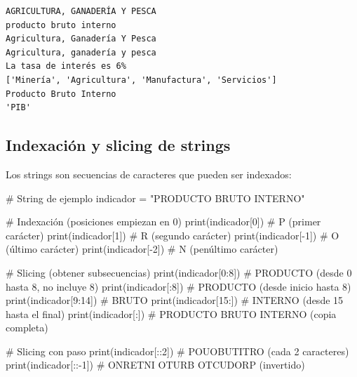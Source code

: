 \documentclass[
  doc,
  floatsintext,
  longtable,
  a4paper,
  nolmodern,
  notxfonts,
  notimes,
  12pt,
  colorlinks=true,linkcolor=blue,citecolor=blue,urlcolor=blue]{apa7}
\newenvironment{Shaded}{\begin{snugshade}}{\end{snugshade}}
\newcommand{\BuiltInTok}[1]{\textcolor[rgb]{0.00,0.23,0.31}{#1}}
\newcommand{\CommentTok}[1]{\textcolor[rgb]{0.37,0.37,0.37}{#1}}
\newcommand{\DecValTok}[1]{\textcolor[rgb]{0.68,0.00,0.00}{#1}}
\newcommand{\NormalTok}[1]{\textcolor[rgb]{0.00,0.23,0.31}{#1}}
\newcommand{\OperatorTok}[1]{\textcolor[rgb]{0.37,0.37,0.37}{#1}}
\newcommand{\StringTok}[1]{\textcolor[rgb]{0.13,0.47,0.30}{#1}}
\begin{document}
\begin{verbatim}
AGRICULTURA, GANADERÍA Y PESCA
producto bruto interno
Agricultura, Ganadería Y Pesca
Agricultura, ganadería y pesca
La tasa de interés es 6%
['Minería', 'Agricultura', 'Manufactura', 'Servicios']
Producto Bruto Interno
'PIB'
\end{verbatim}

\subsection{Indexación y slicing de
strings}\label{indexaciuxf3n-y-slicing-de-strings}

Los strings son secuencias de caracteres que pueden ser indexados:

\begin{Shaded}
\begin{Highlighting}[]
\CommentTok{\# String de ejemplo}
\NormalTok{indicador }\OperatorTok{=} \StringTok{"PRODUCTO BRUTO INTERNO"}

\CommentTok{\# Indexación (posiciones empiezan en 0)}
\BuiltInTok{print}\NormalTok{(indicador[}\DecValTok{0}\NormalTok{])    }\CommentTok{\# P (primer carácter)}
\BuiltInTok{print}\NormalTok{(indicador[}\DecValTok{1}\NormalTok{])    }\CommentTok{\# R (segundo carácter)}
\BuiltInTok{print}\NormalTok{(indicador[}\OperatorTok{{-}}\DecValTok{1}\NormalTok{])   }\CommentTok{\# O (último carácter)}
\BuiltInTok{print}\NormalTok{(indicador[}\OperatorTok{{-}}\DecValTok{2}\NormalTok{])   }\CommentTok{\# N (penúltimo carácter)}

\CommentTok{\# Slicing (obtener subsecuencias)}
\BuiltInTok{print}\NormalTok{(indicador[}\DecValTok{0}\NormalTok{:}\DecValTok{8}\NormalTok{])   }\CommentTok{\# PRODUCTO (desde 0 hasta 8, no incluye 8)}
\BuiltInTok{print}\NormalTok{(indicador[:}\DecValTok{8}\NormalTok{])    }\CommentTok{\# PRODUCTO (desde inicio hasta 8)}
\BuiltInTok{print}\NormalTok{(indicador[}\DecValTok{9}\NormalTok{:}\DecValTok{14}\NormalTok{])  }\CommentTok{\# BRUTO}
\BuiltInTok{print}\NormalTok{(indicador[}\DecValTok{15}\NormalTok{:])   }\CommentTok{\# INTERNO (desde 15 hasta el final)}
\BuiltInTok{print}\NormalTok{(indicador[:])     }\CommentTok{\# PRODUCTO BRUTO INTERNO (copia completa)}

\CommentTok{\# Slicing con paso}
\BuiltInTok{print}\NormalTok{(indicador[::}\DecValTok{2}\NormalTok{])   }\CommentTok{\# POUOBUTITRO (cada 2 caracteres)}
\BuiltInTok{print}\NormalTok{(indicador[::}\OperatorTok{{-}}\DecValTok{1}\NormalTok{])  }\CommentTok{\# ONRETNI OTURB OTCUDORP (invertido)}
\end{Highlighting}
\end{Shaded}
\end{document}

